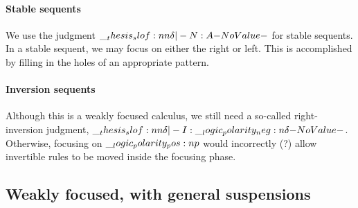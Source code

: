 \paragraph{Stable se{q}uents}
We use the judgment $\slof{\delta |- N : A}$ for stable sequents.
In a stable sequent, we may focus on either the right or left.
This is accomplished by filling in the holes of an appropriate pattern.

\paragraph{Inversion seq\-uents}
Although this is a weakly focused calculus, we still need a so-called right-inversion judgment, $\slof{\delta |- I : \n{\delta}}$.
Otherwise, focusing on $\__logic_polarity_pos:n {p}$ would incorrectly (?) allow invertible rules to be moved inside the focusing phase.


\subsection{Weakly focused, with general suspensions}

